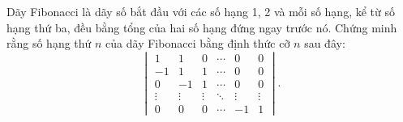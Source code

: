 \documentclass[class=nhvh-linear-algebra,crop=false]{standalone}
\begin{document}
\begin{exercise}
    \par Dãy Fibonacci là dãy số bắt đầu với các số hạng 1, 2 và mỗi số hạng, kể từ số hạng thứ ba, đều bằng tổng của hai số hạng đứng ngay trước nó. Chứng minh rằng số hạng thứ $n$ của dãy Fibonacci bằng định thức cỡ $n$ sau đây:
    \[
        \begin{vmatrix}
            1      & 1      & 0      & \cdots & 0      & 0      \\
            -1     & 1      & 1      & \cdots & 0      & 0      \\
            0      & -1     & 1      & \cdots & 0      & 0      \\
            \vdots & \vdots & \vdots & \ddots & \vdots & \vdots \\
            0      & 0      & 0      & \cdots & -1     & 1
        \end{vmatrix}.
    \]
\end{exercise}
\end{document}
